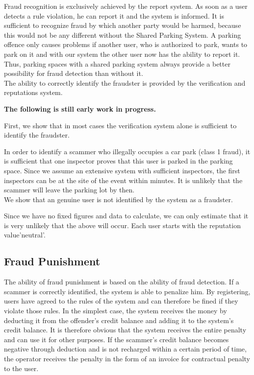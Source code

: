 \documentclass[
a4paper,     %
titlepage,   %
14pt         %
]{scrartcl}  %
\theoremstyle{mystyle}
\begin{document}
Fraud recognition is exclusively achieved by the report system. As soon as a user detects a rule violation, he can report it and the system is informed. It is sufficient to recognize fraud by which another party would be harmed, because this would not be any different without the Shared Parking System. A parking offence only causes problems if another user, who is authorized to park, wants to park on it and with our system the other user now has the ability to report it. Thus, parking spaces with a shared parking system always provide a better possibility for fraud detection than without it. \\

The ability to correctly identify the fraudster is provided by the verification and reputations system. 

\textbf{The following is still early work in progress.}

First, we show that in most cases the verification system alone is sufficient to identify the fraudster.

In order to identify a scammer who illegally occupies a car park (class 1 fraud), it is sufficient that one inspector proves that this user is parked in the parking space. Since we assume an extensive system with sufficient inspectors, the first inspectors can be at the site of the event within minutes. It is unlikely that the scammer will leave the parking lot by then. \\

We show that an genuine user is not identified by the system as a fraudster.

Since we have no fixed figures and data to calculate, we can only estimate that it is very unlikely that the above will occur. Each user starts with the reputation value'neutral'. 


\subsection{Fraud Punishment}
The ability of fraud punishment is based on the ability of fraud detection. If a scammer is correctly identified, the system is able to penalize him. By registering, users have agreed to the rules of the system and can therefore be fined if they violate those rules. In the simplest case, the system receives the money by deducting it from the offender's credit balance and adding it to the system's credit balance. It is therefore obvious that the system receives the entire penalty and can use it for other purposes. If the scammer's credit balance becomes negative through deduction and is not recharged within a certain period of time, the operator receives the penalty in the form of an invoice for contractual penalty to the user.
\end{document}
